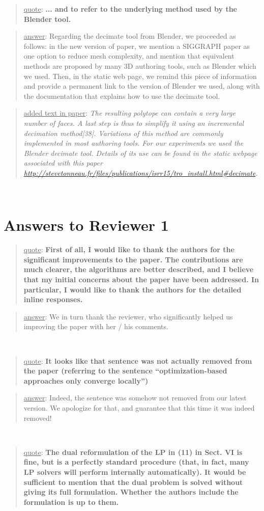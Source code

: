 \documentclass[a4paper]{article}
\newcommand{\ndone}[0]{\textcolor{red}{TODO}}
\newcommand\quot[1]{\begin{quote} \underline{quote}: \textbf{#1}\end{quote}}
\newcommand\as[1]{\begin{quote} \underline{answer}: {#1}\end{quote} }
\newcommand\qt[1]{\begin{quote} \underline{added text in paper}: \textit{#1}\end{quote} \leavevmode \\ }
\begin{document}
\leavevmode 
\quot {... and to refer
to the underlying method used by the Blender tool.}

\as{Regarding the decimate tool from Blender, we proceeded as follows: in the new version of paper, we mention a SIGGRAPH paper as one option to reduce mesh complexity, and mention that equivalent methods are proposed by many 3D authoring tools, such as Blender which we used. Then, in the static web page, we remind this piece of information and provide a permanent link to the version of Blender we used, along with the documentation that explains how to use the decimate tool.}

\qt{The resulting polytope can contain a very large number of faces.  A last step is thus to simplify it using an incremental decimation method[38].
Variations of this method are commonly implemented in most authoring tools. For our experiments we used the Blender decimate tool. Details of its use can be found in the static webpage associated with this paper \url{http://stevetonneau.fr/files/publications/isrr15/tro_install.html\#decimate}.\\}

\section{Answers to Reviewer 1}

\quot{First of all, I would like to thank the authors for the significant
improvements to the paper. The contributions are much clearer, the
algorithms are better described, and I believe that my initial concerns
about the paper have been addressed. In particular, I would like to
thank the authors for the detailed inline responses.}

\as{We in turn thank the reviewer, who significantly helped us improving the paper with her / his comments.}

\leavevmode \\
\quot {It looks like that sentence was not actually removed from the
paper (referring to the sentence ``optimization-based approaches
only converge locally'')
}

\as{Indeed, the sentence was somehow not removed from our latest version. We apologize for that, and guarantee that this time it was indeed removed!}

\leavevmode \\
\quot {
The dual reformulation of the LP in (11) in Sect. VI is fine, but is
a perfectly standard procedure (that, in fact, many LP solvers will
perform internally automatically). It would be sufficient to mention
that the dual problem is solved without giving its full formulation.
Whether the authors include the formulation is up to them.}
\end{document}
